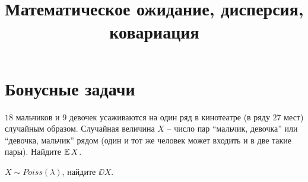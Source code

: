 

\title{Математическое ожидание, дисперсия, ковариация}
\date{\vspace{-1cm}}


\maketitle

\section*{Бонусные задачи}

\begin{problem}
    $18$ мальчиков и $9$ девочек усаживаются на один ряд в кинотеатре (в ряду $27$ мест) случайным образом.
    Случайная величина $X$ -- число пар ``мальчик, девочка'' или ``девочка, мальчик'' рядом (один и тот же человек может входить и в две такие пары).
    Найдите $\operatorname{\mathbb{E}} X$.
\end{problem}

\begin{problem}
    $X \sim Poiss(\lambda)$, найдите $\DD X$.
\end{problem}




